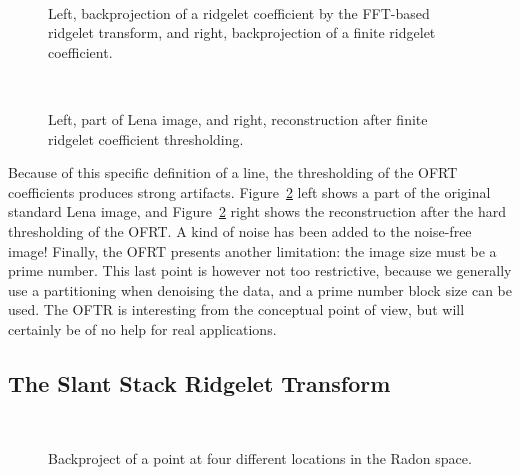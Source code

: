 \begin{figure}[htb]
\centerline{
\vbox{
\hbox{
}}}
\caption{Left, backprojection of a ridgelet coefficient by the 
FFT-based ridgelet transform,
and right, backprojection of a finite ridgelet coefficient.}
\label{fig_cmp_backproj}
\end{figure}

\begin{figure}[htb]
\centerline{
\vbox{
\hbox{
}}}
\caption{Left, part of Lena image,
and right, reconstruction after finite ridgelet coefficient thresholding.}
\label{fig_cmp_recl257}
\end{figure}

Because of this specific definition of a line, the thresholding of the OFRT
coefficients produces strong artifacts. 
Figure~\ref{fig_cmp_recl257} left shows a part 
of the original standard Lena image, and 
Figure~\ref{fig_cmp_recl257} right shows the reconstruction after the 
hard thresholding of the OFRT. A kind of noise has been added to the 
noise-free image!
Finally, the OFRT presents another limitation: the image size  
must be a prime number. This last point is however not too restrictive, 
because we generally use a partitioning when denoising the data, and a
prime number block size can be used. 
The OFTR is interesting from the conceptual point of view, but will
certainly be of no help for real applications.  

\subsection{The Slant Stack Ridgelet Transform}

\begin{figure}[htb]

\centerline{
\vbox{
\hbox{
}
\hbox{
}}}
\caption{Backproject of a point at four different locations in the 
Radon space.}
\label{fig_back_stack_radon}
\end{figure}

